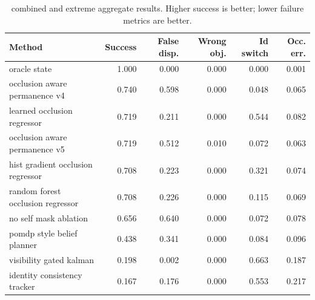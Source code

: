 \begin{table}[t]
\centering
\caption{combined and extreme aggregate results. Higher success is better; lower failure metrics are better.}
\label{tab:combined_and_extreme}
\small
\begin{tabular}{lrrrrr}
\toprule
Method & Success & False disp. & Wrong obj. & Id switch & Occ. err. \\
\midrule
oracle state & 1.000 & 0.000 & 0.000 & 0.000 & 0.001 \\
occlusion aware permanence v4 & 0.740 & 0.598 & 0.000 & 0.048 & 0.065 \\
learned occlusion regressor & 0.719 & 0.211 & 0.000 & 0.544 & 0.082 \\
occlusion aware permanence v5 & 0.719 & 0.512 & 0.010 & 0.072 & 0.063 \\
hist gradient occlusion regressor & 0.708 & 0.223 & 0.000 & 0.321 & 0.074 \\
random forest occlusion regressor & 0.708 & 0.226 & 0.000 & 0.115 & 0.069 \\
no self mask ablation & 0.656 & 0.640 & 0.000 & 0.072 & 0.078 \\
pomdp style belief planner & 0.438 & 0.341 & 0.000 & 0.084 & 0.096 \\
visibility gated kalman & 0.198 & 0.002 & 0.000 & 0.663 & 0.187 \\
identity consistency tracker & 0.167 & 0.176 & 0.000 & 0.553 & 0.217 \\
\bottomrule
\end{tabular}
\end{table}
